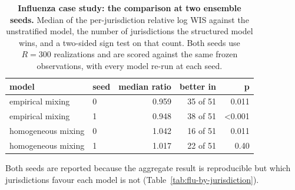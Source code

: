 \begin{table}[tb]
\centering
\caption{\textbf{Influenza case study: the comparison at two ensemble seeds.} Median of the per-jurisdiction relative log WIS against the unstratified model, the number of jurisdictions the structured model wins, and a two-sided sign test on that count. Both seeds use $R=300$ realizations and are scored against the same frozen observations, with every model re-run at each seed.}
\label{tab:flu-reproducibility}
\footnotesize
\setlength{\tabcolsep}{5pt}
\begin{tabular}{@{}llrrr@{}}
\toprule
model & seed & \textbf{median ratio} & \textbf{better in} & \textbf{p} \\
\midrule
empirical mixing & 0 & 0.959 & 35 of 51 & 0.011 \\
empirical mixing & 1 & 0.948 & 38 of 51 & <0.001 \\
homogeneous mixing & 0 & 1.042 & 16 of 51 & 0.011 \\
homogeneous mixing & 1 & 1.017 & 22 of 51 & 0.40 \\
\bottomrule
\end{tabular}
\par\medskip\raggedright\scriptsize Both seeds are reported because the aggregate result is reproducible but which jurisdictions favour each model is not (Table~\ref{tab:flu-by-jurisdiction}).
\end{table}
